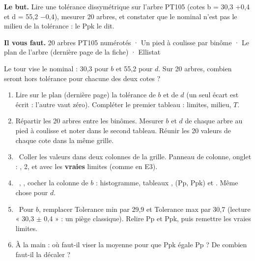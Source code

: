 \documentclass[10pt,a4paper]{article}
\begin{document}
\thispagestyle{fancy}
\begin{tcolorbox}[boite]\textbf{Le but.} Lire une tolérance dissymétrique sur l'arbre PT105 (cotes b = 30,3 +0,4 et d = 55,2 −0,4), mesurer 20 arbres, et constater que le nominal n'est pas le milieu de la tolérance : le Ppk le dit.\par\textbf{Il vous faut.} 20 arbres PT105 numérotés · Un pied à coulisse par binôme · Le plan de l'arbre (dernière page de la fiche) · Ellistat\end{tcolorbox}
\begin{tcolorbox}[pred]Le tour vise le nominal : 30,3 pour $b$ et 55,2 pour $d$. Sur 20 arbres, combien seront hors tolérance pour chacune des deux cotes ?\reponse\end{tcolorbox}
\begin{enumerate}[label=\textcolor{cyan}{\textbf{\arabic*.}},leftmargin=15pt,itemsep=1.5pt]
\item Lire sur le plan (dernière page) la tolérance de $b$ et de $d$ (un seul écart est écrit : l'autre vaut zéro). Compléter le premier tableau : limites, milieu, $T$.
\item Répartir les 20 arbres entre les binômes. Mesurer $b$ et $d$ de chaque arbre au pied à coulisse et noter dans le second tableau. Réunir les 20 valeurs de chaque cote dans la même grille.
\item \tagE\ Coller les valeurs dans deux colonnes de la grille. Panneau de colonne, onglet  : ,  2,  et  avec les \textbf{vraies} limites (comme en E3).
\item \tagE\ , , cocher la colonne de $b$ : histogramme, tableaux ,  (Pp, Ppk) et . Même chose pour $d$.
\item \tagE\ Pour $b$, remplacer Tolerance min par 29,9 et Tolerance max par 30,7 (lecture « 30,3 $\pm$ 0,4 » : un piège classique). Relire Pp et Ppk, puis remettre les vraies limites.
\item À la main : où faut-il viser la moyenne pour que Ppk égale Pp ? De combien faut-il la décaler ?
\end{enumerate}
\par\vspace{5pt}
\end{document}

